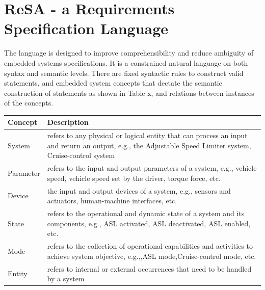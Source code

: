 \section{ReSA - a Requirements Specification Language}
The language is designed to improve comprehensibility and reduce ambiguity of embedded systems specifications. It is a constrained natural language on both syntax and semantic levels. There are fixed syntactic rules to construct valid statements, and embedded system concepts that dectate the semantic construction of statements as shown in Table x, and relations between instances of the concepts.
\begin{table}[]\small
	\begin{tabular}{@{}lp{}@{}}
		\toprule
		Concept & Description \\ \midrule
		System & refers to any physical or logical entity that can process an input and return an output, e.g., the Adjustable Speed Limiter system, Cruise-control system \\
		Parameter & refers to the input and output parameters of a system, e.g., vehicle speed, vehicle speed set by the driver, torque force, etc. \\
		Device & the input and output devices of a system, e.g., sensors and actuators, human-machine interfaces, etc. \\
		State & refers to the operational and dynamic state of a system and its components, e.g., ASL activated, ASL deactivated, ASL enabled, etc. \\
		Mode & refers to the collection of operational capabilities and activities to achieve system objective, e.g.,,ASL mode,Cruise-control mode, etc. \\
		Entity & refers to internal or external occurrences that need to be handled by a system \\ \bottomrule
	\end{tabular}
\end{table}

